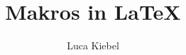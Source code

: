 \documentclass[11pt]{beamer}
\begin{document}
	\author{Luca Kiebel}
	\title{Makros in \LaTeX}
	\begin{frame}[plain]
	\maketitle
\end{frame}

\begin{frame}
\frametitle{}
\end{frame}
\end{document}
